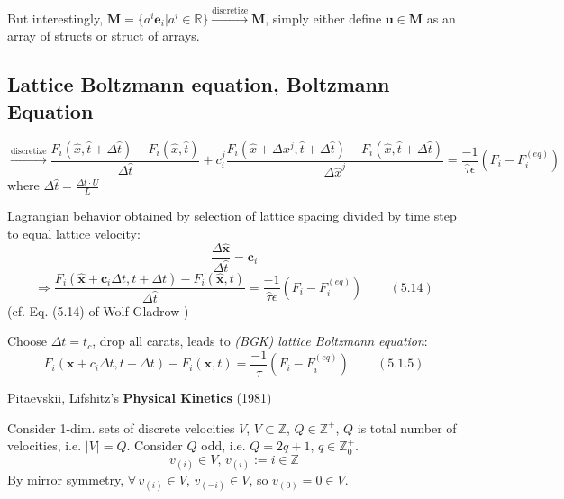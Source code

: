 \documentclass[twoside,landscape,10pt]{amsart}
\theoremstyle{plain}
\theoremstyle{definition}
\theoremstyle{remark}
\theoremstyle{remark}
\begin{document}
\begin{multicols*}{2}
But interestingly, $\mathbf{M} = \lbrace a^i \mathbf{e}_i | a^i \in \mathbb{R} \rbrace \xrightarrow{\text{discretize}} \mathbf{M}$, simply either define $\mathbf{u} \in \mathbf{M}$ as an array of structs or struct of arrays.  




\subsection{Lattice Boltzmann equation, Boltzmann Equation}



\[
\xrightarrow{\text{discretize}} \frac{F_i(\widehat{x},\widehat{t} + \Delta \widehat{t} )- F_i(\widehat{x},\widehat{t} ) }{ \Delta \widehat{t} } + c_i^j \frac{F_i(\widehat{x} + \Delta x^j, \widehat{t} + \Delta \widehat{t} )- F_i(\widehat{x}, \widehat{t} + \Delta \widehat{t} ) }{ \Delta \widehat{x}^j } = \frac{-1}{ \widehat{\tau} \epsilon } (F_i - F_i^{(eq)} )
\]
where $\Delta \widehat{t} = \frac{\Delta t \cdot U}{L}$

Lagrangian behavior obtained by selection of lattice spacing divided by time step to equal lattice velocity:
\begin{equation}
  \frac{ \Delta \widehat{ \mathbf{x}} }{ \Delta \widehat{t}} = \mathbf{c}_i 
\end{equation}
\begin{equation}
  \Longrightarrow \frac{ F_i(\widehat{\mathbf{x}} + \mathbf{c}_i \Delta t, t+ \Delta t ) - F_i(\widehat{\mathbf{x}} , t) }{ \Delta \widehat{t}} = \frac{-1}{ \widehat{\tau} \epsilon }( F_i-F_i^{(eq)} ) \qquad \, (5.14)
\end{equation} (cf. Eq. (5.14) of Wolf-Gladrow \cite{DWol2000})

Choose $\Delta t = t_c$, drop all carats, leads to \emph{(BGK) lattice Boltzmann equation}:
\begin{equation}
  F_i(\mathbf{x}+c_i\Delta t, t+\Delta t) - F_i(\mathbf{x},t) = \frac{-1}{\tau} (F_i - F_i^{(eq)} ) \qquad \, (5.1.5)
  \end{equation}

Pitaevskii, Lifshitz's \textbf{Physical Kinetics} (1981) \cite{PL1981}


Consider 1-dim. sets of discrete velocities $V$, $V\subset \mathbb{Z}$, $Q\in \mathbb{Z}^+$, $Q$ is total number of velocities, i.e. $|V|=Q$.  Consider $Q$ odd, i.e. $Q=2q+1$, $q\in \mathbb{Z}^+_0$.
\[
v_{(i)}\in V, \, v_{(i)} := i \in \mathbb{Z}
\]
By mirror symmetry, $\forall \, v_{(i)} \in V$, $v_{(-i)} \in V$, so $v_{(0)} =0\in V$.  





\end{multicols*}
\end{document}
